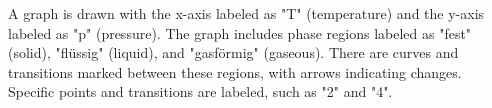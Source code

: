 A graph is drawn with the x-axis labeled as "T" (temperature) and the y-axis labeled as "p" (pressure). The graph includes phase regions labeled as "fest" (solid), "flüssig" (liquid), and "gasförmig" (gaseous). There are curves and transitions marked between these regions, with arrows indicating changes. Specific points and transitions are labeled, such as "2" and "4".